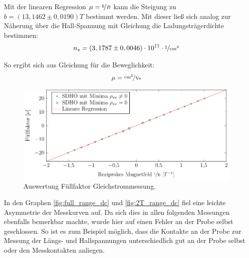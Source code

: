 Mit der linearen Regression $\mu = \nicefrac{b}{B}$ kann die Steigung zu $b=(13,1462 \pm 0,0190)\unit{T}$ bestimmt werden. Mit dieser ließ sich analog zur Näherung über die Hall-Spannung mit Gleichung %
die Ladungsträgerdichte bestimmen:
\begin{equation}
n_s= (3,1787 \pm 0,0046)\cdot 10^{11} \cdot \unitfrac{1}{cm^2}
\end{equation}

So ergibt sich aus Gleichung %
für die Beweglichkeit:
\begin{equation}
\mu= \unitfrac{cm^2}{Vs}   %
\end{equation}
 

\begin{figure}[h]
	\centering
	\includegraphics{graphs/dc/auswertung.pdf}
	\caption[Auswertung Füllfaktor Gleichstrommessung]{
		Auswertung Füllfaktor Gleichstrommessung.
	}
	\label{fig:dc_sdho_ausw}
\end{figure}

In den Graphen \ref{fig:full_range_dc} und \ref{fig:2T_range_dc} fiel eine leichte Asymmetrie der Messkurven auf. Da sich dies in allen folgenden Messungen ebenfalls bemerkbar machte, wurde hier auf einen Fehler an der Probe selbst geschlossen. So ist es zum Beispiel möglich, dass die Kontakte an der Probe zur Messung der Längs- und Hallspannungen unterschiedlich gut an der Probe selbst oder den Messkontakten anliegen. 